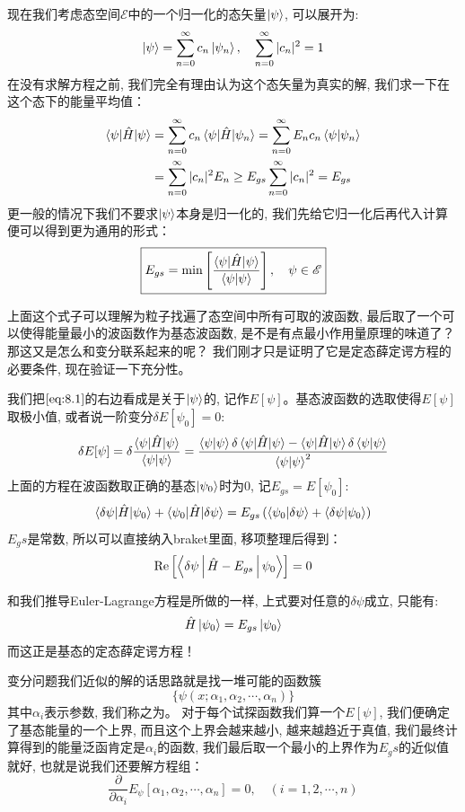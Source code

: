 \documentclass[a4paper,zihao=-4,linespread=1]{ctexrep}
\begin{document}
    现在我们考虑态空间$\mathscr{E}$中的一个归一化的态矢量$\ket{\psi}$, 可以展开为:
    \[\ket{\psi}=\sum_{n=0}^{\infty}c_n\ket{\psi_n},\quad\sum_{n=0}^{\infty}|c_n|^2=1\]
    在没有求解方程之前, 我们完全有理由认为这个态矢量为真实的解, 我们求一下在这个态下的能量平均值：
    \begin{align*}
        \braket{\psi|\hat{H}|\psi}&=\sum_{n=0}^{\infty}c_n\braket{\psi|\hat{H}|\psi_n}=\sum_{n=0}^{\infty}E_nc_n\braket{\psi|\psi_n}\\
        &=\sum_{n=0}^{\infty}|c_n|^2E_n\geq E_{gs}\sum_{n=0}^{\infty}|c_n|^2=E_{gs}
    \end{align*}
    更一般的情况下我们不要求$\ket{\psi}$本身是归一化的, 我们先给它归一化后再代入计算便可以得到更为通用的形式：
    \begin{equation}
        \label{eq:8.1}
        \boxed{
            E_{gs}=\mathrm{min}\left[\frac{\braket{\psi|\hat{H}|\psi}}{\braket{\psi|\psi}}\right],\quad\psi\in\mathscr{E}
        }
    \end{equation}

    上面这个式子可以理解为粒子找遍了态空间中所有可取的波函数, 最后取了一个可以使得能量最小的波函数作为基态波函数, 是不是有点最小作用量原理的味道了？那这又是怎么和变分联系起来的呢？
    我们刚才只是证明了它是定态薛定谔方程的必要条件, 现在验证一下充分性。

    我们把$\ref{eq:8.1}$的右边看成是关于$\ket{\psi}$的, 记作$E[\psi]$。基态波函数的选取使得$E[\psi]$取极小值, 或者说一阶变分$\delta E[\psi_0]=0$:
    \begin{equation*}
        \delta E[\psi]=\delta\frac{\braket{\psi|\hat{H}|\psi}}{\braket{\psi|\psi}}
        =\frac{\braket{\psi|\psi}\delta \braket{\psi|\hat{H}|\psi}-\braket{\psi|\hat{H}|\psi}\delta \braket{\psi|\psi}}{\braket{\psi|\psi}^2}
    \end{equation*}
    上面的方程在波函数取正确的基态$\ket{\psi_0}$时为0, 记$E_{gs}=E[\psi_0]$:
    \[\braket{\delta\psi|\hat{H}|\psi_0}+\braket{\psi_0|\hat{H}|\delta\psi}=E_{gs}\left(\braket{\psi_0|\delta\psi}+\braket{\delta\psi|\psi_0}\right)\]
    $E_gs$是常数, 所以可以直接纳入braket里面, 移项整理后得到：
    \[\mathrm{Re}\left[\Braket{\delta\psi|\hat{H}-E_{gs}|\psi_0}\right]=0\]
    
    和我们推导Euler-Lagrange方程是所做的一样, 上式要对任意的$\delta\psi$成立, 只能有:
    $$\hat{H}\ket{\psi_0}=E_{gs}\ket{\psi_0}$$
    而这正是基态的定态薛定谔方程！

    变分问题我们近似的解的话思路就是找一堆可能的函数簇$$\{\psi(x;\alpha_1,\alpha_2,\cdots,\alpha_n)\}$$其中$\alpha_i$表示参数, 我们称之为。
    对于每个试探函数我们算一个$E[\psi]$, 我们便确定了基态能量的一个上界, 而且这个上界会越来越小, 越来越趋近于真值, 我们最终计算得到的能量泛函肯定是$\alpha_i$的函数,
    我们最后取一个最小的上界作为$E_gs$的近似值就好, 也就是说我们还要解方程组：
    \[\frac{\partial}{\partial\alpha_i}E_\psi[\alpha_1,\alpha_2,\cdots,\alpha_n]=0,\quad (i=1,2,\cdots,n)\]
\end{document}
